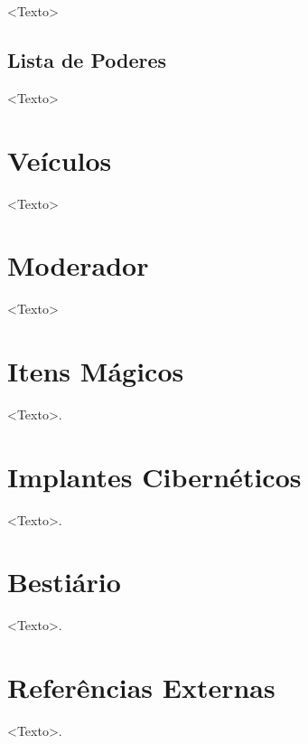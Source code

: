 \documentclass[a4paper, twocolumn, 10pt]{book}
\begin{document}
<Texto>

\section{Lista de Poderes}

<Texto>

\chapter{Veículos}

<Texto>

\chapter{Moderador}

<Texto>

\appendix

\chapter{Itens Mágicos}

<Texto>.

\chapter{Implantes Cibernéticos}

<Texto>.

\chapter{Bestiário}

<Texto>.

\chapter{Referências Externas}

<Texto>.
\end{document}
